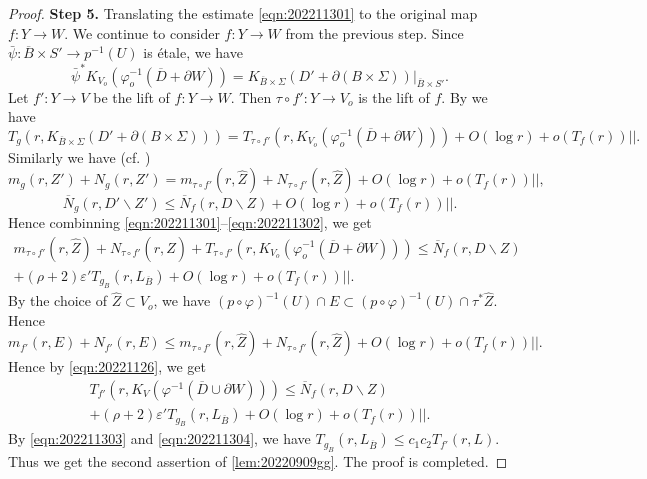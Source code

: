 \documentclass[11pt,english]{smfart}
\theoremstyle{plain}
\theoremstyle{definition}
\theoremstyle{remark}
\numberwithin{equation}{section}
\theoremstyle{plain}
\begin{document}
\begin{proof}
		
	\textbf{Step 5.}  Translating the estimate \eqref{eqn:202211301} to the original map $f:Y\to W$.
	We continue to consider $f:Y\to W$ from the previous step.
		Since $\bar{\psi}:\overline{B}\times S'\to p^{-1}(U)$ is {\'e}tale, we have
		$$
		\bar{\psi}^*K_{V_o}(\varphi_o^{-1}(\overline{D}+\partial W))=K_{\overline{B}\times \Sigma}(D'+\partial (B\times \Sigma))|_{\overline{B}\times S'}.
		$$
		Let $f':Y\to V$ be the lift of $f:Y\to W$.
		Then $\tau\circ f':Y\to V_o$ is the lift of $f$.
		By \cite[Lemma 3.1]{Yam06} we have  
		\begin{equation}
			T_{g}(r,K_{\overline{B}\times \Sigma}(D'+\partial (B\times \Sigma)))=T_{\tau\circ f'}(r,K_{V_o}(\varphi_o^{-1}(\overline{D}+\partial W)))+O(\log r)+o(T_f(r))||.
		\end{equation}
		Similarly we have (cf. \cite[Lemma 1]{Yam15})
		\begin{equation}
			m_{g}(r,Z')+N_{g}(r,Z')=m_{\tau\circ f'}(r,\widehat{Z})+N_{\tau\circ f'}(r,\widehat{Z})+O(\log r)+o(T_f(r))||,
		\end{equation}
		\begin{equation}\label{eqn:202211302}
			\overline{N}_{g}(r,D'\backslash Z')\leq \overline{N}_{f}(r,D\backslash Z)+O(\log r)+o(T_f(r))||.
		\end{equation}
		Hence combinning \eqref{eqn:202211301}--\eqref{eqn:202211302}, we get
		\begin{multline}
			m_{\tau\circ f'}(r,\widehat{Z})+N_{\tau\circ f'}(r,\widehat{Z})+T_{\tau\circ f'}(r,K_{V_o}(\varphi_o^{-1}(\overline{D}+\partial W)))
			\leq \overline{N}_{f}(r,D\backslash Z)
			\\
			+(\rho+2)\varepsilon' T_{g_B}(r,L_{\overline{B}})
			+O(\log r)+o(T_f(r))||.
		\end{multline}
		By the choice of $\widehat{Z}\subset V_o$, we have $(p\circ \varphi)^{-1}(U)\cap E\subset (p\circ\varphi)^{-1}(U)\cap \tau^*\widehat{Z}$.
		Hence
		$$
		m_{f'}(r,E)+N_{f'}(r,E)\leq m_{\tau\circ f'}(r,\widehat{Z})+N_{\tau\circ f'}(r,\widehat{Z})+O(\log r)+o(T_f(r))||.
		$$
		Hence by \eqref{eqn:20221126}, we get
		\begin{multline}
			T_{f'}(r,K_{V}(\varphi^{-1}(\overline{D}\cup \partial W)))
			\leq \overline{N}_{f}(r,D\backslash Z)
			\\
			+(\rho+2)\varepsilon' T_{g_B}(r,L_{\overline{B}})
			+O(\log r)+o(T_f(r))||.
		\end{multline}
		By \eqref{eqn:202211303} and \eqref{eqn:202211304}, we have $T_{g_B}(r,L_{\overline{B}})\leq c_1c_2T_{f'}(r,L)$.
		Thus we get the second assertion of \cref{lem:20220909gg}.
		The proof is completed.
	\end{proof}
	
\end{document}
